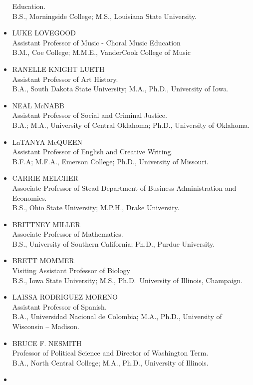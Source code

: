 \documentclass[
  letterpaper,
]{scrbook}
\begin{document}
\begin{itemize}
  Education.\\
  B.S., Morningside College; M.S., Louisiana State University.
\item
  LUKE LOVEGOOD\\
  Assistant Professor of Music - Choral Music Education\\
  B.M., Coe College; M.M.E., VanderCook College of Music
\item
  RANELLE KNIGHT LUETH\\
  Assistant Professor of Art History.\\
  B.A., South Dakota State University; M.A., Ph.D., University of Iowa.
\item
  NEAL McNABB\\
  Assistant Professor of Social and Criminal Justice.\\
  B.A.; M.A., University of Central Oklahoma; Ph.D., University of
  Oklahoma.
\item
  LaTANYA McQUEEN\\
  Assistant Professor of English and Creative Writing.\\
  B.F.A; M.F.A., Emerson College; Ph.D., University of Missouri.
\item
  CARRIE MELCHER\\
  Associate Professor of Stead Department of Business Administration and
  Economics.\\
  B.S., Ohio State University; M.P.H., Drake University.
\item
  BRITTNEY MILLER\\
  Associate Professor of Mathematics.\\
  B.S., University of Southern California; Ph.D., Purdue University.
\item
  BRETT MOMMER\\
  Visiting Assistant Professor of Biology\\
  B.S., Iowa State University; M.S., Ph.D.~University of Illinois,
  Champaign.
\item
  LAISSA RODRIGUEZ MORENO\\
  Assistant Professor of Spanish.\\
  B.A., Universidad Nacional de Colombia; M.A., Ph.D., University of
  Wisconsin -- Madison.
\item
  BRUCE F. NESMITH\\
  Professor of Political Science and Director of Washington Term.\\
  B.A., North Central College; M.A., Ph.D., University of Illinois.
\item

\end{itemize}
\end{document}

